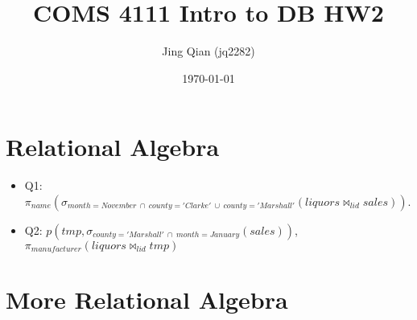 \documentclass{article}
\title{COMS 4111 Intro to DB HW2}
\author{Jing Qian (jq2282)}
\date{\today}
\begin{document}
\maketitle



\pagebreak

\section{Relational Algebra}
\begin{itemize}
    \item Q1: 
    $\pi_{name} (\sigma_{month=November\ \cap\ county='Clarke'\ \cup\ county = 'Marshall'} (liquors \bowtie_{lid}sales)) $.
    
    \item Q2: 
    $p(tmp, \sigma_{county = 'Marshall'\ \cap\ month = January} (sales))$, 
    $\pi_{manufacturer} (liquors \bowtie_{lid} tmp) $
\end{itemize}

\newpage

\section{More Relational Algebra}
\end{document}
